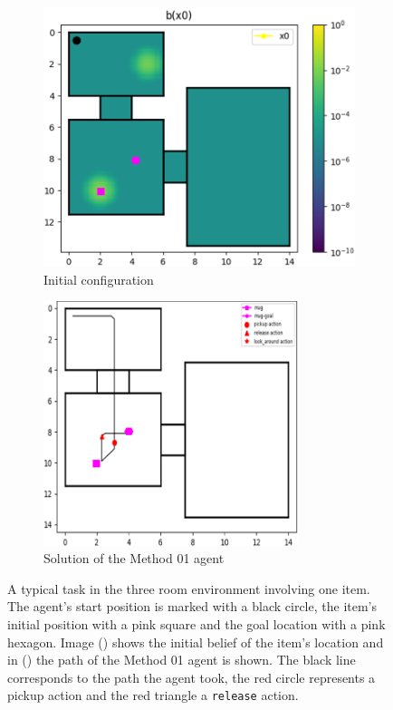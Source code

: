 \begin{figure}[h]
    \centering
    \begin{subfigure}[b]{0.49\textwidth}
        \includegraphics[width=\textwidth]{Report/images/experiments/envsmall_sc01_belief_items.png}
        \caption{Initial configuration}
        \label{subfig:sc01_b0}
    \end{subfigure}
    \hfill
    \begin{subfigure}[b]{0.49\textwidth}
         \includegraphics[width=0.82\textwidth]{Report/images/experiments/envsmall_sc01_sol_D1_edited.png}
        \caption{Solution of the Method 01 agent}
        \label{subfig:sc01_sol}
    \end{subfigure}
    \caption{A typical task in the three room environment involving one item. The agent's start position is marked with a black circle, the item's initial position with a pink square and the goal location with a pink hexagon. Image () shows the initial belief of the item's location and in () the path of the Method 01 agent is shown. The black line corresponds to the path the agent took, the red circle represents a pickup action and the red triangle a \texttt{release} action.}
    \label{fig:sc01}
\end{figure}

